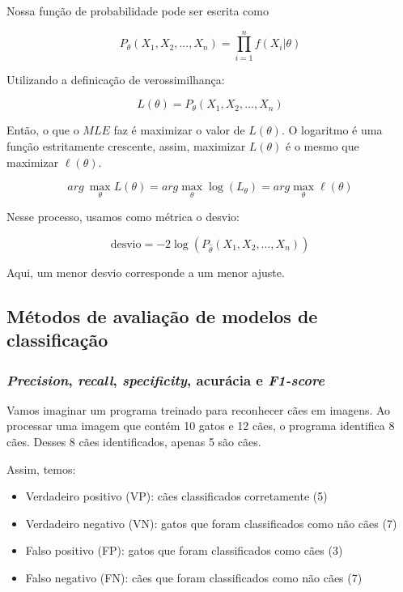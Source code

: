 \documentclass{article}
\begin{document}
Nossa função de probabilidade pode ser escrita como

\begin{equation}
    P_{\theta}(X_1, X_2, ..., X_n) = \prod_{i = 1}^{n} f(X_i | \theta)
\end{equation}

Utilizando a definicação de verossimilhança: 

\begin{equation*}
    L(\theta) = P_{\theta}(X_1, X_2, ..., X_n)
\end{equation*}

Então, o que o $MLE$ faz é maximizar o valor de $L(\theta)$. O logaritmo 
é uma função estritamente crescente, assim, maximizar $L(\theta)$ é o mesmo 
que maximizar $\ell (\theta)$.

\begin{equation}
    arg \ \max_{\theta} L(\theta) = arg \max_{\theta} \log(L_\theta) = arg \max_{\theta} \ell (\theta)
\end{equation}

Nesse processo, usamos como métrica o desvio:

\begin{equation}
    \text{desvio} = -2 \log(P_{\hat{\theta}} (X_1, X_2, ..., X_n))
\end{equation}

Aqui, um menor desvio corresponde a um menor ajuste.

\subsection{Métodos de avaliação de modelos de classificação}

\subsubsection{\textit{Precision}, \textit{recall}, \textit{specificity}, acurácia e \textit{F1-score}}

Vamos imaginar um programa treinado para reconhecer cães em imagens. Ao 
processar uma imagem que contém 10 gatos e 12 cães, o programa identifica
8 cães. Desses 8 cães identificados, apenas 5 são cães. 

Assim, temos:

\begin{itemize}
    \item Verdadeiro positivo (VP): cães classificados corretamente (5)
    \item Verdadeiro negativo (VN): gatos que foram classificados como não cães (7)
    \item Falso positivo (FP): gatos que foram classificados como cães (3)
    \item Falso negativo (FN): cães que foram classificados como não cães (7)
\end{itemize}
\end{document}
